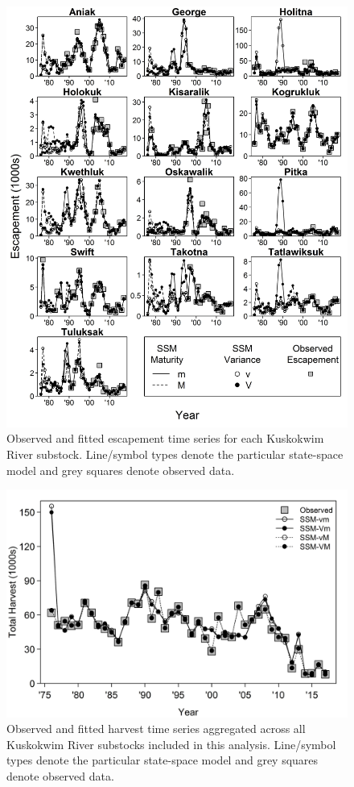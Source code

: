 \documentclass[12pt,]{book}
\theoremstyle{definition}
\theoremstyle{definition}
\theoremstyle{definition}
\theoremstyle{remark}
\begin{document}
\clearpage

\begin{figure}
  \centering
  \includegraphics{img/Ch4/S-fit.jpg}
  \caption{Observed and fitted escapement time series for each Kuskokwim River substock. Line/symbol types denote the particular state-space model and grey squares denote observed data.}
  \label{fig:S-fit}
\end{figure}

\clearpage

\begin{figure}
  \centering
  \includegraphics{img/Ch4/H-fit.jpg}
  \caption{Observed and fitted harvest time series aggregated across all Kuskokwim River substocks included in this analysis. Line/symbol types denote the particular state-space model and grey squares denote observed data.}
  \label{fig:H-fit}
\end{figure}
\end{document}
